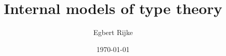 \documentclass{article}
\title{Internal models of type theory}
\author{Egbert Rijke}
\date{\today}
\begin{document}
\maketitle

\tableofcontents

\begin{comment}
\section*{Introduction\phantomsection\addcontentsline{toc}{section}{Introduction}}
This paper contributes to the univalent homotopy type theory~\cite{kapulkin2012univalence,awodey2012type,pelayo2012homotopy}
program which connects and extends a number of topics such as type theory, (elementary) topos
theory~\cite{MacLaneMoerdijk,johnstone:elephant}, homotopy theory, higher category theory and higher topos
theory~\cite{rezk2010toposes,lurie2009higher}.
A key missing ingredient is a first-order (`elementary') definition of a higher topos. It has been
conjectured~\cite{awodey2012type,shulman2012univalence} that homotopy type theory can be used as the internal language, and thus may
provide an elementary definition of a higher topos; see also~\cite{LumsdaineWarren}.


\end{comment}
\end{document}
